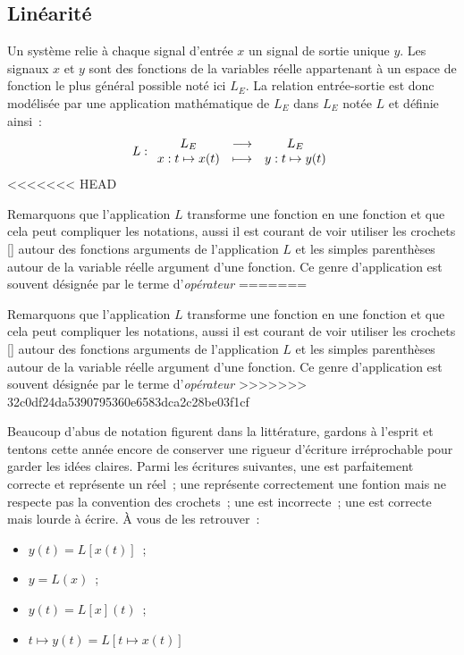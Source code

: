 	\subsection{Linéarité} 
	Un système relie à chaque signal d'entrée $x$ un signal de
        sortie unique $y$. Les signaux $x$ et $y$ sont des fonctions
        de la variables réelle appartenant à un espace de fonction le
        plus général possible noté ici $L_E$. La relation
        entrée-sortie est donc modélisée par une application
        mathématique de $L_E$ dans $L_E$ notée $L$ et définie ainsi~:
	\begin{equation}
          L : \begin{array}{ccc} L_E & \longrightarrow & L_E \\ x : t\mapsto x(t) & \longmapsto & y : t\mapsto y(t) \\ \end{array} 
	\end{equation}
<<<<<<< HEAD
	\begin{remark}{}
	    Remarquons que l'application $L$ transforme une fonction en une fonction et que cela peut compliquer les notations, aussi il est courant de voir utiliser les crochets [] autour des fonctions arguments de l'application $L$ et les simples parenthèses autour de la variable réelle argument d'une fonction. Ce genre d'application est souvent désignée par le terme d'\emph{opérateur}
=======

	\begin{remarque}{}
          Remarquons que l'application $L$ transforme une fonction en
          une fonction et que cela peut compliquer les notations,
          aussi il est courant de voir utiliser les crochets [] autour
          des fonctions arguments de l'application $L$ et les simples
          parenthèses autour de la variable réelle argument d'une
          fonction. Ce genre d'application est souvent désignée par le
          terme d'\emph{opérateur}
>>>>>>> 32c0df24da5390795360e6583dca2c28be03f1cf
	    
          Beaucoup d'abus de notation figurent dans la littérature,
          gardons à l'esprit et tentons cette année encore de
          conserver une rigueur d'écriture irréprochable pour garder
          les idées claires. Parmi les écritures suivantes, une est
          parfaitement correcte et représente un réel~; une représente
          correctement une fontion mais ne respecte pas la convention
          des crochets~; une est incorrecte~; une est correcte mais
          lourde à écrire. À vous de les retrouver~:
          \begin{itemize}
          \item $y(t) = L[x(t)]$~;
          \item $y = L(x)$~;
          \item $y(t) = L[x](t)$~;
          \item $t\mapsto y(t) = L[t\mapsto x(t)]$
          \end{itemize}{}
	\end{remarque}
	

\end{remark}
